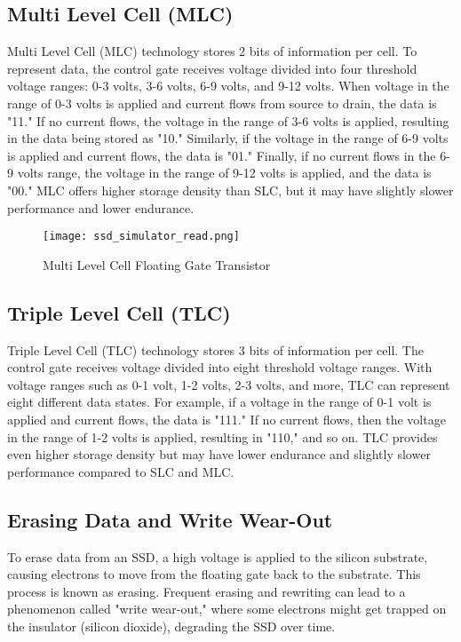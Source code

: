 \documentclass[conference]{/home/habib/Desktop/flash_ssd_simulator_web/paper_writing/latex_file/IEEEtran}
\begin{document}
\subsection{Multi Level Cell (MLC)}
Multi Level Cell (MLC) technology stores 2 bits of information per cell. To represent data, the control gate receives voltage divided into four threshold voltage ranges: 0-3 volts, 3-6 volts, 6-9 volts, and 9-12 volts. When voltage in the range of 0-3 volts is applied and current flows from source to drain, the data is "11." If no current flows, the voltage in the range of 3-6 volts is applied, resulting in the data being stored as "10." Similarly, if the voltage in the range of 6-9 volts is applied and current flows, the data is "01." Finally, if no current flows in the 6-9 volts range, the voltage in the range of 9-12 volts is applied, and the data is "00." MLC offers higher storage density than SLC, but it may have slightly slower performance and lower endurance.
\begin{figure}[h]
    \centering
    \texttt{[image: ssd\_simulator\_read.png]}
    \caption{Multi Level Cell Floating Gate Transistor}
    \label{fig:ssd_simulator_read}
\end{figure}
\subsection{Triple Level Cell (TLC)}
Triple Level Cell (TLC) technology stores 3 bits of information per cell. The control gate receives voltage divided into eight threshold voltage ranges. With voltage ranges such as 0-1 volt, 1-2 volts, 2-3 volts, and more, TLC can represent eight different data states. For example, if a voltage in the range of 0-1 volt is applied and current flows, the data is "111." If no current flows, then the voltage in the range of 1-2 volts is applied, resulting in "110," and so on. TLC provides even higher storage density but may have lower endurance and slightly slower performance compared to SLC and MLC.

\subsection{Erasing Data and Write Wear-Out}
To erase data from an SSD, a high voltage is applied to the silicon substrate, causing electrons to move from the floating gate back to the substrate. This process is known as erasing. Frequent erasing and rewriting can lead to a phenomenon called "write wear-out," where some electrons might get trapped on the insulator (silicon dioxide), degrading the SSD over time.
\end{document}
